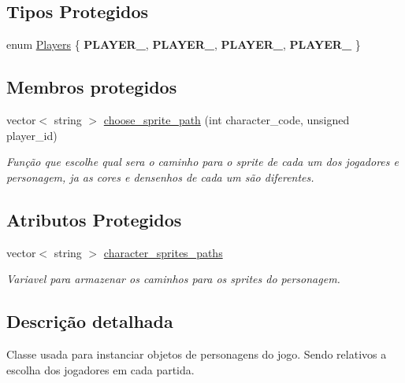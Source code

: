 \subsection*{Tipos Protegidos}
\begin{DoxyCompactItemize}
\item 
enum \mbox{\hyperlink{classCharacterFactory_ab974578549c551e10056540617a269df}{Players}} \{ {\bfseries P\+L\+A\+Y\+E\+R\+\_}, 
{\bfseries P\+L\+A\+Y\+E\+R\+\_}, 
{\bfseries P\+L\+A\+Y\+E\+R\+\_}, 
{\bfseries P\+L\+A\+Y\+E\+R\+\_}
 \}
\end{DoxyCompactItemize}
\subsection*{Membros protegidos}
\begin{DoxyCompactItemize}
\item 
vector$<$ string $>$ \mbox{\hyperlink{classCharacterFactory_ae34183113755bfceb1a2906686e999af}{choose\+\_\+sprite\+\_\+path}} (int character\+\_\+code, unsigned player\+\_\+id)
\begin{DoxyCompactList}\small\item\em Função que escolhe qual sera o caminho para o sprite de cada um dos jogadores e personagem, ja as cores e densenhos de cada um são diferentes. \end{DoxyCompactList}\end{DoxyCompactItemize}
\subsection*{Atributos Protegidos}
\begin{DoxyCompactItemize}
\item 
\mbox{\label{classCharacterFactory_adc71232fb6551d9f1dd80941dee7c7f9}} 
vector$<$ string $>$ \mbox{\hyperlink{classCharacterFactory_adc71232fb6551d9f1dd80941dee7c7f9}{character\+\_\+sprites\+\_\+paths}}
\begin{DoxyCompactList}\small\item\em Variavel para armazenar os caminhos para os sprites do personagem. \end{DoxyCompactList}\end{DoxyCompactItemize}


\subsection{Descrição detalhada}
Classe usada para instanciar objetos de personagens do jogo. Sendo relativos a escolha dos jogadores em cada partida. 

